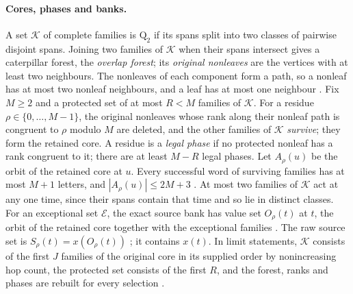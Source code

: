 \paragraph{Cores, phases and banks.}
A set $\mathcal K$ of complete families is $\mathrm Q_2$ if its spans split into two
classes of pairwise disjoint spans. Joining two families of $\mathcal K$ when their
spans intersect gives a caterpillar forest, the \emph{overlap forest}; its
\emph{original nonleaves} are the vertices with at least two neighbours. The nonleaves
of each component form a path, so a nonleaf has at most two nonleaf neighbours, and a
leaf has at most one neighbour \cite[Lemma~2.6]{SourceCovers2026}. Fix $M\ge2$ and a
protected set of at most $R<M$ families of $\mathcal K$. For a residue
$\rho\in\{0,\dots,M-1\}$, the original nonleaves whose rank along their nonleaf path
is congruent to $\rho$ modulo $M$ are deleted, and the other families of $\mathcal K$
\emph{survive}; they form the retained core. A residue is a \emph{legal phase} if no
protected nonleaf has a rank congruent to it; there are at least $M-R$ legal phases.
Let $A_\rho(u)$ be the orbit of the retained core at $u$. Every successful word of
surviving families has at most $M+1$ letters, and $|A_\rho(u)|\le2M+3$
\cite[Lemma~2.6]{SourceCovers2026}. At most two families of $\mathcal K$ act at any one
time, since their spans contain that time and so lie in distinct classes. For an
exceptional set $\mathcal E$, the exact source bank has value set $O_\rho(t)$ at $t$,
the orbit of the retained core together with the exceptional families
\cite[Theorem~2.7]{SourceCovers2026}. The raw source set is $S_\rho(t)=x(O_\rho(t))$
\cite[Section~3.1]{SourceCovers2026}; it contains $x(t)$. In limit statements,
$\mathcal K$ consists of the first $J$ families of the original core in its supplied
order by nonincreasing hop count, the protected set consists of the first $R$, and the
forest, ranks and phases are rebuilt for every selection
\cite[Section~4.2]{SourceCovers2026}.

